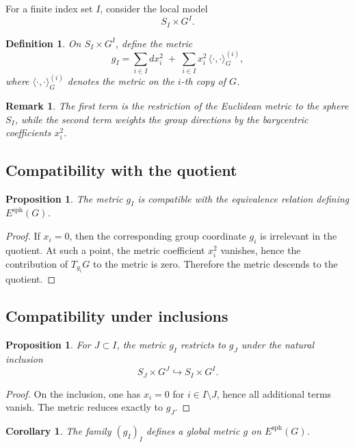 \documentclass[11pt]{amsart}
\newtheorem{corollary}[theorem]{Corollary}
\newtheorem{proposition}[theorem]{Proposition}
\newtheorem{definition}[theorem]{Definition}
\newtheorem{remark}[theorem]{Remark}
\begin{document}
For a finite index set $I$, consider the local model
\[
S_I \times G^I.
\]

\begin{definition}
On $S_I \times G^I$, define the metric
\[
g_I
=
\sum_{i\in I} dx_i^2
\;+\;
\sum_{i\in I} x_i^2 \,\langle \cdot,\cdot \rangle_G^{(i)},
\]
where $\langle \cdot,\cdot \rangle_G^{(i)}$ denotes the metric on the $i$-th copy of $G$.
\end{definition}

\begin{remark}
The first term is the restriction of the Euclidean metric to the sphere $S_I$, while the second term weights the group directions by the barycentric coefficients $x_i^2$.
\end{remark}

\subsection{Compatibility with the quotient}

\begin{proposition}
The metric $g_I$ is compatible with the equivalence relation defining $E^{\mathrm{sph}}(G)$.
\end{proposition}

\begin{proof}
If $x_i = 0$, then the corresponding group coordinate $g_i$ is irrelevant in the quotient. At such a point, the metric coefficient $x_i^2$ vanishes, hence the contribution of $T_{g_i}G$ to the metric is zero. Therefore the metric descends to the quotient.
\end{proof}

\subsection{Compatibility under inclusions}

\begin{proposition}
For $J \subset I$, the metric $g_I$ restricts to $g_J$ under the natural inclusion
\[
S_J \times G^J \hookrightarrow S_I \times G^I.
\]
\end{proposition}

\begin{proof}
On the inclusion, one has $x_i = 0$ for $i \in I \setminus J$, hence all additional terms vanish. The metric reduces exactly to $g_J$.
\end{proof}

\begin{corollary}
The family $(g_I)_I$ defines a global metric $g$ on $E^{\mathrm{sph}}(G)$.
\end{corollary}
\end{document}
